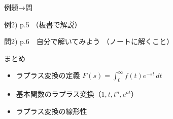 \documentclass[aspectratio=43,professionalfonts,handout]{beamer}
\begin{document}
\begin{frame}{例題→問}
  \begin{exampleblock}{例2) p.5}
    （板書で解説）
  \end{exampleblock}

  \vfill

  \begin{block}{問2) p.6　自分で解いてみよう}
    （ノートに解くこと）
  \end{block}
\end{frame}

\begin{frame}{まとめ}
  \begin{itemize}
    \item ラプラス変換の定義 $F(s)=\int_0^\infty f(t)e^{-st}\,dt$
    \item 基本関数のラプラス変換（$1, t, t^n, e^{at}$）
    \item ラプラス変換の線形性
  \end{itemize}
\end{frame}
\end{document}
